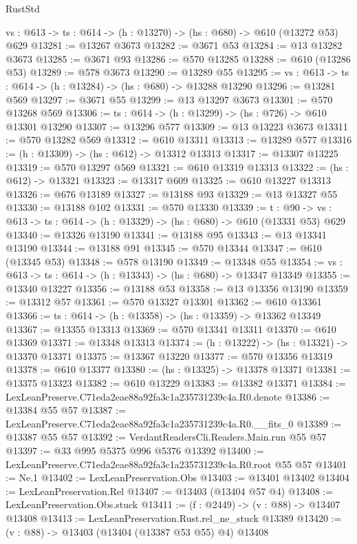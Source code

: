 \begin{lexlean}{RustStd}
\begin{coremodule}
  {vs : @613} -> {ts : @614} -> (h : @13270) -> (hs : @680) -> @610 (@13272 @53) @629
@13281 := @13267 @3673
@13282 := @3671 @53
@13284 := @13 @13282 @3673
@13285 := @3671 @93
@13286 := @570 @13285
@13288 := @610 (@13286 @53)
@13289 := @578 @3673
@13290 := @13289 @55
@13295 := {vs : @613} -> {ts : @614} -> (h : @13284) -> (hs : @680) -> @13288 @13290
@13296 := @13281 @569
@13297 := @3671 @55
@13299 := @13 @13297 @3673
@13301 := @570 @13268 @569
@13306 := {ts : @614} -> (h : @13299) -> (hs : @726) -> @610 @13301 @13290
@13307 := @13296 @577
@13309 := @13 @13223 @3673
@13311 := @570 @13282 @569
@13312 := @610 @13311
@13313 := @13289 @577
@13316 := (h : @13309) -> (hs : @612) -> @13312 @13313
@13317 := @13307 @13225
@13319 := @570 @13297 @569
@13321 := @610 @13319 @13313
@13322 := (hs : @612) -> @13321
@13323 := @13317 @609
@13325 := @610 @13227 @13313
@13326 := @676 @13189
@13327 := @13188 @93
@13329 := @13 @13327 @55
@13330 := @13188 @102
@13331 := @570 @13330
@13339 := {t : @90} ->
  {vs : @613} -> {ts : @614} -> (h : @13329) -> (hs : @680) -> @610 (@13331 @53) @629
@13340 := @13326 @13190
@13341 := @13188 @95
@13343 := @13 @13341 @13190
@13344 := @13188 @91
@13345 := @570 @13344
@13347 := @610 (@13345 @53)
@13348 := @578 @13190
@13349 := @13348 @55
@13354 := {vs : @613} -> {ts : @614} -> (h : @13343) -> (hs : @680) -> @13347 @13349
@13355 := @13340 @13227
@13356 := @13188 @53
@13358 := @13 @13356 @13190
@13359 := @13312 @57
@13361 := @570 @13327 @13301
@13362 := @610 @13361
@13366 := {ts : @614} -> (h : @13358) -> (hs : @13359) -> @13362 @13349
@13367 := @13355 @13313
@13369 := @570 @13341 @13311
@13370 := @610 @13369
@13371 := @13348 @13313
@13374 := (h : @13222) -> (hs : @13321) -> @13370 @13371
@13375 := @13367 @13220
@13377 := @570 @13356 @13319
@13378 := @610 @13377
@13380 := (hs : @13325) -> @13378 @13371
@13381 := @13375 @13323
@13382 := @610 @13229
@13383 := @13382 @13371
@13384 := LexLeanPreserve.C71eda2eae88a92fa3c1a235731239c4a.R0.denote
@13386 := @13384 @55 @57
@13387 := LexLeanPreserve.C71eda2eae88a92fa3c1a235731239c4a.R0.__fits_0
@13389 := @13387 @55 @57
@13392 := VerdantReadersCli.Readers.Main.run @55 @57
@13397 := @33 @995 @5375 @996 @5376 @13392
@13400 := LexLeanPreserve.C71eda2eae88a92fa3c1a235731239c4a.R0.root @55 @57
@13401 := Ne.{1}
@13402 := LexLeanPreservation.Obs
@13403 := @13401 @13402
@13404 := LexLeanPreservation.Rel
@13407 := @13403 (@13404 @57 @4)
@13408 := LexLeanPreservation.Obs.stuck
@13411 := (f : @2449) -> (v : @88) -> @13407 @13408
@13413 := LexLeanPreservation.Rust.rel_ne_stuck @13389
@13420 := (v : @88) -> @13403 (@13404 (@13387 @53 @55) @4) @13408

\end{coremodule}
\end{lexlean}
